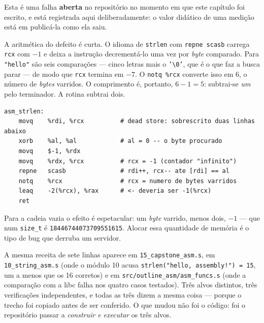 \begin{aviso}
Esta é uma falha \textbf{aberta} no repositório no momento em que este capítulo
foi escrito, e está registrada aqui deliberadamente: o valor didático de uma
medição está em publicá-la como ela saiu.
\end{aviso}

A aritmética do defeito é curta. O idioma de \texttt{strlen} com
\texttt{repne scasb} carrega \texttt{rcx} com $-1$ e deixa a instrução
decrementá-lo uma vez por \emph{byte} comparado. Para \texttt{"hello"} são seis
comparações --- cinco letras mais o \texttt{'\textbackslash 0'}, que é o que
faz a busca parar --- de modo que \texttt{rcx} termina em $-7$. O
\texttt{notq \%rcx} converte isso em $6$, o número de \emph{bytes} varridos. O
comprimento é, portanto, $6 - 1 = 5$: subtrai-se \emph{um} pelo terminador. A
rotina subtrai dois.

\begin{lstlisting}[style=bt, language=GAS,
    caption={O trecho (resumo de \texttt{src/asm\_course/15\_capstone\_asm.s}) --- e,
             idêntico, em \texttt{10\_string\_asm.s} e em
             \texttt{src/outline\_asm/asm\_funcs.s}.}]
asm_strlen:
    movq    %rdi, %rcx          # dead store: sobrescrito duas linhas abaixo
    xorb    %al, %al            # al = 0 -- o byte procurado
    movq    $-1, %rdx
    movq    %rdx, %rcx          # rcx = -1 (contador "infinito")
    repne   scasb               # rdi++, rcx-- ate [rdi] == al
    notq    %rcx                # rcx = numero de bytes varridos
    leaq    -2(%rcx), %rax      # <- deveria ser -1(%rcx)
    ret
\end{lstlisting}

Para a cadeia vazia o efeito é espetacular: um \emph{byte} varrido, menos dois,
$-1$ --- que num \texttt{size\_t} é \texttt{18446744073709551615}. Alocar essa
quantidade de memória é o tipo de bug que derruba um servidor.

\begin{armadilha}
A mesma receita de sete linhas aparece em \texttt{15\_capstone\_asm.s}, em
\texttt{10\_string\_asm.s} (onde o módulo 10 acusa
\texttt{strlen("hello, assembly!") = 15}, um a menos que os 16 corretos) e em
\texttt{src/outline\_asm/asm\_funcs.s} (onde a comparação com a libc falha nos
quatro casos testados). Três alvos distintos, três verificações independentes,
e todas as três dizem a mesma coisa --- porque o trecho foi copiado antes de
ser conferido. O que mudou não foi o código: foi o repositório passar a
\emph{construir e executar} os três alvos.
\end{armadilha}

